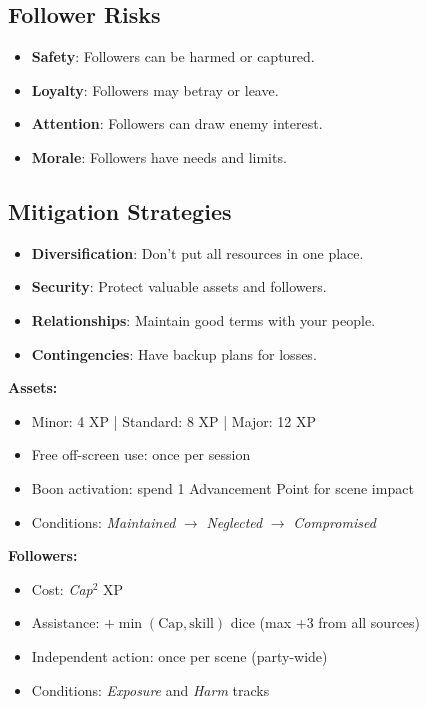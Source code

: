 \begin{multicols}{2}
\subsection*{Follower Risks}
\begin{itemize}
\item \textbf{Safety}: Followers can be harmed or captured.
\item \textbf{Loyalty}: Followers may betray or leave.
\item \textbf{Attention}: Followers can draw enemy interest.
\item \textbf{Morale}: Followers have needs and limits.
\end{itemize}

\subsection*{Mitigation Strategies}
\begin{itemize}
\item \textbf{Diversification}: Don't put all resources in one place.
\item \textbf{Security}: Protect valuable assets and followers.
\item \textbf{Relationships}: Maintain good terms with your people.
\item \textbf{Contingencies}: Have backup plans for losses.
\end{itemize}

\begin{tcolorbox}[colback=blue!5!white,colframe=blue!75!black,title=Assets and Followers Quick Reference,fonttitle=\bfseries]
\textbf{Assets:}
\begin{itemize}
\item Minor: 4 XP \;|\; Standard: 8 XP \;|\; Major: 12 XP
\item Free off-screen use: once per session
\item Boon activation: spend 1 Advancement Point for scene impact
\item Conditions: \emph{Maintained} $\rightarrow$ \emph{Neglected} $\rightarrow$ \emph{Compromised}
\end{itemize}

\textbf{Followers:}
\begin{itemize}
\item Cost: \emph{Cap}$^2$ XP
\item Assistance: $+\min(\text{Cap},\text{skill})$ dice (max +3 from all sources)
\item Independent action: once per scene (party-wide)
\item Conditions: \emph{Exposure} and \emph{Harm} tracks
\end{itemize}


\end{tcolorbox}
\end{multicols}
